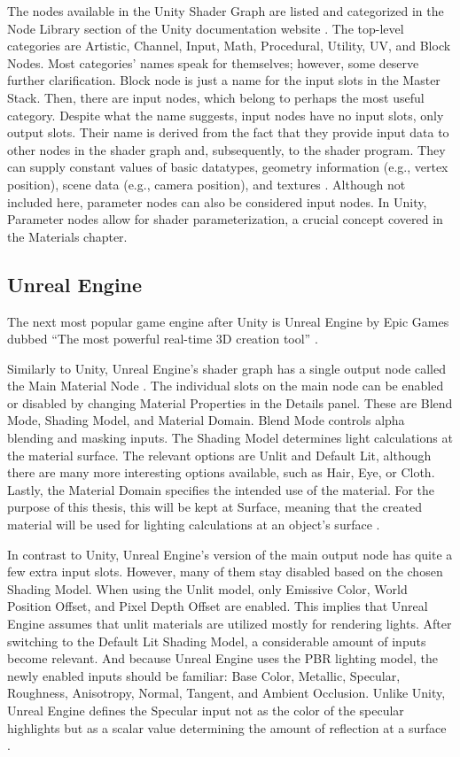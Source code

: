 \documentclass[
  digital,     %
  oneside,     %
  nosansbold,  %
  nocolorbold, %
  lof,         %
  lot,         %
]{fithesis4}
\begin{document}
The nodes available in the Unity Shader Graph are listed and categorized in the Node Library section
of the Unity documentation website \cite{unity-node-library}. The top-level categories are Artistic, Channel, Input,
Math, Procedural, Utility, UV, and Block Nodes. Most categories' names speak for themselves; however, some deserve
further clarification. Block node is just a name for the input slots in the Master Stack. Then, there are input nodes,
which belong to perhaps the most useful category. Despite what the name suggests,
input nodes have no input slots, only output slots. Their name is derived from the fact that
they provide input data to other nodes in the shader graph and, subsequently,
to the shader program. They can supply constant values of basic datatypes,
geometry information (e.g., vertex position), scene data (e.g., camera position), and textures \cite{unity-input-nodes}.
Although not included here, parameter nodes can also be considered input nodes.
In Unity, Parameter nodes allow for shader parameterization, a crucial concept covered in the Materials chapter.

\subsection{Unreal Engine}
The next most popular game engine after Unity is Unreal Engine by Epic Games \cite{slashdata-game-engines} dubbed \enquote{The most
powerful real-time 3D creation tool} \cite{ue}.

Similarly to Unity, Unreal Engine's shader graph has a single output node called the Main Material Node \cite{ue-main-node}.
The individual slots on the main node can be enabled or disabled by changing Material Properties in the Details panel. These are
Blend Mode, Shading Model, and Material Domain. Blend Mode controls alpha blending and masking inputs. The Shading Model
determines light calculations at the material surface. The relevant options are Unlit and Default Lit,
although there are many more interesting options available, such as Hair, Eye, or Cloth. Lastly, the Material Domain
specifies the intended use of the material. For the purpose of this thesis, this will be kept at Surface, meaning that
the created material will be used for lighting calculations at an object's surface \cite{ue-material-inputs}.

In contrast to Unity, Unreal Engine's version of the main output node has quite a few extra input slots. However, many of them
stay disabled based on the chosen Shading Model. When using the Unlit model, only Emissive Color, World Position Offset,
and Pixel Depth Offset are enabled. This implies that Unreal Engine assumes that unlit materials are utilized mostly for rendering lights.
After switching to the Default Lit Shading Model, a considerable amount of inputs become relevant. And because Unreal Engine uses the PBR
lighting model, the newly enabled inputs should be familiar: Base Color, Metallic, Specular, Roughness, Anisotropy,
Normal, Tangent, and Ambient Occlusion. Unlike Unity, Unreal Engine defines the Specular input not as the color of the
specular highlights but as a scalar value determining the amount of reflection at a surface \cite{ue-material-inputs}.
\end{document}
